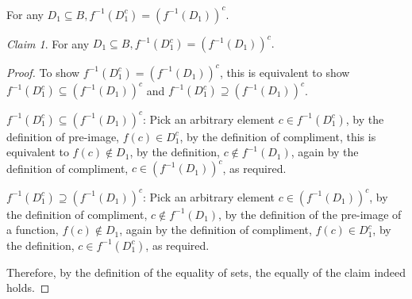 \documentclass{homework}
\theoremstyle{remark}
\newtheorem*{claim}{Claim}
\newcommand{\?}{\stackrel{?}{=}}
\begin{document}
\question For any $D_1\subseteq B, f^{-1}(D_1^c)=(f^{-1}(D_1))^c.$ 
\begin{claim}
    For any $D_1\subseteq B, f^{-1}(D_1^c)=(f^{-1}(D_1))^c.$
\end{claim}
\begin{proof}
    To show $f^{-1}(D_1^c)=(f^{-1}(D_1))^c$, this is equivalent to show $f^{-1}(D_1^c)\subseteq (f^{-1}(D_1))^c$ and $f^{-1}(D_1^c)\supseteq (f^{-1}(D_1))^c$. 

    \underline{$f^{-1}(D_1^c)\subseteq (f^{-1}(D_1))^c$}: Pick an arbitrary element $c\in f^{-1}(D_1^c)$, by the definition of pre-image, $f(c)\in D_1^c$, by the definition of compliment, this is equivalent to $f(c)\notin D_1$, by the definition,  $c\notin f^{-1}(D_1)$, again by the definition of compliment, $c\in (f^{-1}(D_1))^c$, as required. 

    \underline{$f^{-1}(D_1^c)\supseteq (f^{-1}(D_1))^c$}: Pick an arbitrary element $c\in (f^{-1}(D_1))^c$, by the definition of compliment, $c\notin f^{-1}(D_1)$, by the definition of the pre-image of a function, $f(c)\notin D_1$, again by the definition of compliment, $f(c)\in D_1^c$, by the definition, $c\in f^{-1}(D_1^c)$, as required.

    Therefore, by the definition of the equality of sets, the equally of the claim indeed holds. 
\end{proof}



\newpage
\end{document}
